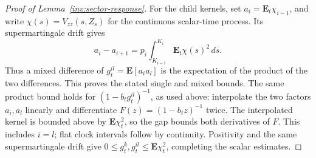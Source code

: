 \begin{proof}[Proof of Lemma~\ref{inv:sector-response}]
For the child kernels, set \(a_i=\mathbf E_t\chi_{i-1}\), and write
\(\chi(s)=V_{zz}(s,Z_s)\) for the continuous scalar-time process.
Its supermartingale drift gives
\[
 a_i-a_{i+1}
 =p_i\int_{K_{i-1}}^{K_i}\mathbf E_t\chi(s)^2\,ds.
\]
Thus a mixed difference of \(g_t^{il}=\mathbf E[a_i a_l]\) is
the expectation of the product of the two differences. This proves
the stated single and mixed bounds. The same product bound holds for
\((1-b_tg_t^{il})^{-1}\), as used above: interpolate the two
factors \(a_i,a_l\) linearly and differentiate
\(F(z)=(1-b_tz)^{-1}\) twice. The interpolated kernel is bounded
above by \(\mathbf E\chi_t^2\), so the gap bounds both derivatives
of \(F\). This includes \(i=l\); flat clock intervals follow by
continuity. Positivity and the same supermartingale drift give
\(0\le g_t^k,g_t^{il}\le\mathbf E\chi_t^2\), completing the
scalar estimates.
\end{proof}
